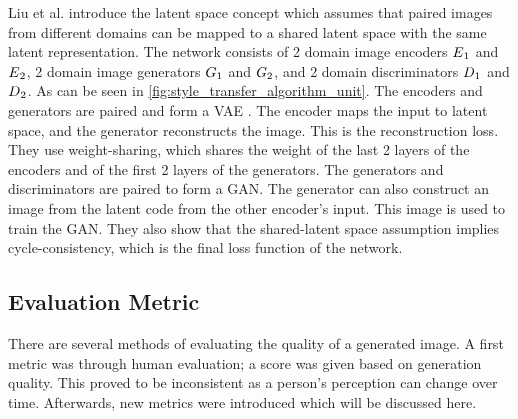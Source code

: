 Liu et al. \cite{Liu2017} introduce the latent space concept which assumes that paired images from different domains can be mapped to a shared latent space with the same latent representation.
The network consists of 2 domain image encoders $E\textsubscript{$1$}$ and $E\textsubscript{$2$}$, 2 domain image generators $G\textsubscript{$1$}$ and $G\textsubscript{$2$}$, and 2 domain discriminators $D\textsubscript{$1$}$ and $D\textsubscript{$2$}$.
As can be seen in \ref{fig:style_transfer_algorithm_unit}.
The encoders and generators are paired and form a \gls{VAE} \cite{kingma2022}.
The encoder maps the input to latent space, and the generator reconstructs the image.
This is the reconstruction loss.
They use weight-sharing, which shares the weight of the last 2 layers of the encoders and of the first 2 layers of the generators.
The generators and discriminators are paired to form a \gls{GAN}.
The generator can also construct an image from the latent code from the other encoder's input.
This image is used to train the \gls{GAN}.
They also show that the shared-latent space assumption implies cycle-consistency, which is the final loss function of the network.

\subsection{Evaluation Metric}
\label{sec:style_transfer_metrics}
There are several methods of evaluating the quality of a generated image. 
A first metric was through human evaluation; a score was given based on generation quality.
This proved to be inconsistent as a person's perception can change over time.
Afterwards, new metrics were introduced which will be discussed here. \cite{Hoyez2022}

